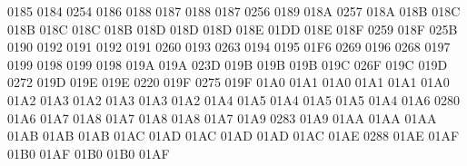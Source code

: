  0185 0184 %
 0254 0186 %
 0188 0187 %
 0188 0187 %
 0256 0189 %
\setcclcucx 018A 0257 018A %
\setcclcucx 018B 018C 018B %
\setcclcucx 018C 018C 018B %
\setcclcucx 018D 018D 018D %
\setcclcucx 018E 01DD 018E %
\setcclcucx 018F 0259 018F %
 025B 0190 %
 0192 0191 %
 0192 0191 %
 0260 0193 %
 0263 0194 %
 0195 01F6 %
 0269 0196 %
 0268 0197 %
 0199 0198 %
 0199 0198 %
\setcclcucx 019A 019A 023D %
\setcclcucx 019B 019B 019B %
\setcclcucx 019C 026F 019C %
\setcclcucx 019D 0272 019D %
\setcclcucx 019E 019E 0220 %
\setcclcucx 019F 0275 019F %
\setcclcucx 01A0 01A1 01A0 %
\setcclcucx 01A1 01A1 01A0 %
\setcclcucx 01A2 01A3 01A2 %
\setcclcucx 01A3 01A3 01A2 %
\setcclcucx 01A4 01A5 01A4 %
\setcclcucx 01A5 01A5 01A4 %
\setcclcucx 01A6 0280 01A6 %
\setcclcucx 01A7 01A8 01A7 %
\setcclcucx 01A8 01A8 01A7 %
\setcclcucx 01A9 0283 01A9 %
\setcclcucx 01AA 01AA 01AA %
\setcclcucx 01AB 01AB 01AB %
\setcclcucx 01AC 01AD 01AC %
\setcclcucx 01AD 01AD 01AC %
\setcclcucx 01AE 0288 01AE %
\setcclcucx 01AF 01B0 01AF %
\setcclcucx 01B0 01B0 01AF %
